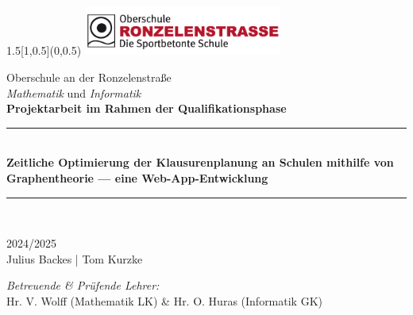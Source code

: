 \begin{titlepage}
\BgThispage
\begin{textblock}{1.5}[1,0.5](0,0.5)
	\includegraphics[width=6.5cm]{logos/logoronzelen.png}\\[3.5cm]
  \end{textblock}
  

  
\bigskip
\bigskip
\begin{center}
{ \large{Oberschule an der Ronzelenstraße\\[0.2cm]
\textit{Mathematik} und \textit{Informatik}}}\\[1cm]

{\large \textbf{Projektarbeit im Rahmen der Qualifikationsphase}}\\[0.6cm]

\rule{\linewidth}{0.5mm} \\[0.1cm]
{ \huge \bfseries Zeitliche Optimierung der Klausurenplanung an Schulen mithilfe von Graphentheorie — eine Web-App-Entwicklung
 \\[0.1cm] }
\rule{\linewidth}{0.5mm} \\[1.5cm]

\noindent

{\large  
    2024/2025
  } \\[1cm] 

{\Large  
    Julius Backes | Tom Kurzke
  } \\

\begin{center}
    
\end{center}

{\textit{Betreuende \& Prüfende Lehrer:}}\\[0.3cm]
 {Hr. V. Wolff (Mathematik LK) \& Hr. O. Huras (Informatik GK)}




\end{center}


\end{titlepage}